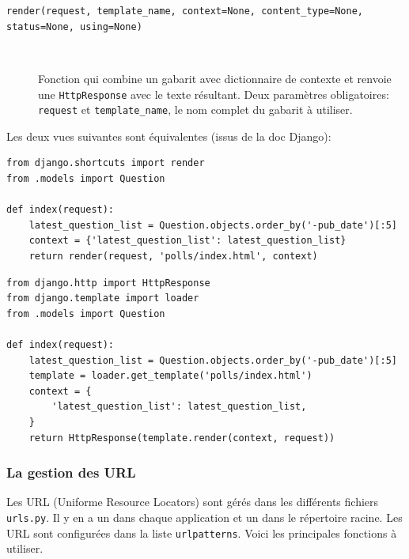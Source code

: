 \documentclass[a4paper, 10pt]{article}
\begin{document}
\begin{description}
    \item[\texttt{render(request, template_name, context=None, content_type=None, status=None, using=None)}]~

          Fonction qui combine un gabarit avec dictionnaire de contexte et renvoie une \texttt{HttpResponse} avec le texte résultant. Deux paramètres obligatoires: \texttt{request} et \texttt{template\_name}, le nom complet du gabarit à utiliser.
\end{description}

Les deux vues suivantes sont équivalentes (issus de la doc
Django):
\begin{verbatim}
from django.shortcuts import render
from .models import Question

def index(request):
    latest_question_list = Question.objects.order_by('-pub_date')[:5]
    context = {'latest_question_list': latest_question_list}
    return render(request, 'polls/index.html', context)
\end{verbatim}

\begin{verbatim}
from django.http import HttpResponse
from django.template import loader
from .models import Question

def index(request):
    latest_question_list = Question.objects.order_by('-pub_date')[:5]
    template = loader.get_template('polls/index.html')
    context = {
        'latest_question_list': latest_question_list,
    }
    return HttpResponse(template.render(context, request))
\end{verbatim}


\subsubsection{La gestion des URL}
Les URL  (Uniforme Resource Locators) sont gérés dans les différents fichiers \texttt{urls.py}. Il y en a un dans chaque application et un dans le répertoire racine. Les URL sont configurées dans la liste \texttt{urlpatterns}. Voici les principales fonctions à utiliser.
\end{document}
